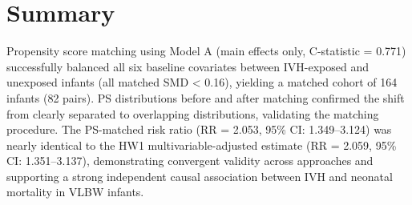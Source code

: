 \documentclass[
]{article}
\begin{document}
\hypertarget{summary}{%
\section{Summary}\label{summary}}

Propensity score matching using Model A (main effects only, C-statistic
= 0.771) successfully balanced all six baseline covariates between
IVH-exposed and unexposed infants (all matched SMD \textless{} 0.16),
yielding a matched cohort of 164 infants (82 pairs). PS distributions
before and after matching confirmed the shift from clearly separated to
overlapping distributions, validating the matching procedure. The
PS-matched risk ratio (RR = 2.053, 95\% CI: 1.349--3.124) was nearly
identical to the HW1 multivariable-adjusted estimate (RR = 2.059, 95\%
CI: 1.351--3.137), demonstrating convergent validity across approaches
and supporting a strong independent causal association between IVH and
neonatal mortality in VLBW infants.
\end{document}
